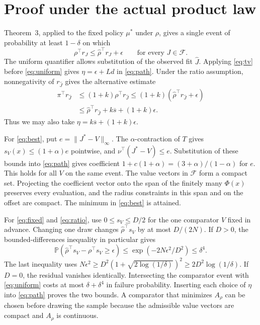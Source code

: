 \documentclass[12pt,a4paper]{article}
\newcommand{\Prob}{\mathbb P}
\newcommand{\cF}{\mathcal F}
\newcommand{\ep}{\epsilon}
\newcommand{\al}{\alpha}
\begin{document}
\newpage
\section*{Proof under the actual product law}
Theorem~3, applied to the fixed policy $\mu^*$ under $\rho$, gives a single
event of probability at least $1-\delta$ on which
\begin{equation}
 \rho^\top r_J\le\widehat\rho^\top r_J+\ep
 \qquad\text{for every }J\in\cF .
 \label{eq:uniform}
\end{equation}
The uniform quantifier allows substitution of the observed fit
$\widehat J$. Applying \eqref{eq:tv} before \eqref{eq:uniform} gives
$\eta=\ep+Ld$ in \eqref{eq:path}. Under the ratio assumption,
nonnegativity of $r_{\widehat J}$ gives the alternative estimate
\begin{align*}
 \pi^\top r_{\widehat J}
 &\le(1+k)\rho^\top r_{\widehat J}
 \le(1+k)(\widehat\rho^\top r_{\widehat J}+\ep)\\
 &\le\widehat\rho^\top r_{\widehat J}
         +k\overline s+(1+k)\ep .
\end{align*}
Thus we may also take $\eta=k\overline s+(1+k)\ep$.

For \eqref{eq:best}, put $e=\|J^*-V\|_\infty$. The $\al$-contraction of
$T$ gives $s_V(x)\le(1+\al)e$ pointwise, and
$\nu^\top(J^*-V)\le e$. Substitution of these bounds into \eqref{eq:path}
gives coefficient $1+c(1+\al)=(3+\al)/(1-\al)$ for $e$.
This holds for all $V$ on the same event. The value vectors in $\cF$ form
a compact set. Projecting the coefficient vector onto the span of the
finitely many $\Phi(x)$ preserves every evaluation, and the radius
constraints in this span and on the offset are compact. The minimum
in \eqref{eq:best} is attained.

For \eqref{eq:fixed} and \eqref{eq:ratio}, use $0\le s_V\le D/2$ for the
one comparator $V$ fixed in advance. Changing one draw changes
$\widehat\rho^\top s_V$ by at most $D/(2N)$. If $D>0$, the
bounded-differences inequality in particular gives
\[
 \Prob\!\left(\widehat\rho^\top s_V-\rho^\top s_V\ge\ep\right)
 \le \exp(-2N\ep^2/D^2)\le\delta^4 .
\]
The last inequality uses
$N\ep^2\ge D^2(1+\sqrt{2\log(1/\delta)})^2
\ge 2D^2\log(1/\delta)$. If $D=0$, the residual vanishes identically.
Intersecting the comparator event with \eqref{eq:uniform} costs at most
$\delta+\delta^4$ in failure probability. Inserting each choice of
$\eta$ into \eqref{eq:path} proves the two bounds. A comparator that
minimizes $A_\rho$ can be chosen before drawing the sample because the
admissible value vectors are compact and $A_\rho$ is continuous.
\end{document}
